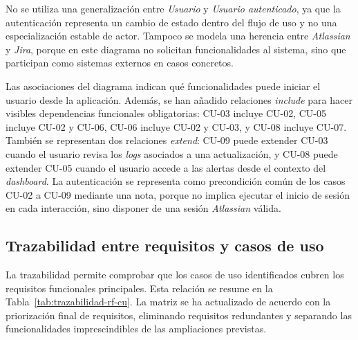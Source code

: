 No se utiliza una generalización entre \textit{Usuario} y \textit{Usuario autenticado}, ya que la autenticación representa un cambio de estado dentro del flujo de uso y no una especialización estable de actor. Tampoco se modela una herencia entre \textit{Atlassian} y \textit{Jira}, porque en este diagrama no solicitan funcionalidades al sistema, sino que participan como sistemas externos en casos concretos.

Las asociaciones del diagrama indican qué funcionalidades puede iniciar el usuario desde la aplicación. Además, se han añadido relaciones \textit{include} para hacer visibles dependencias funcionales obligatorias: CU-03 incluye CU-02, CU-05 incluye CU-02 y CU-06, CU-06 incluye CU-02 y CU-03, y CU-08 incluye CU-07. También se representan dos relaciones \textit{extend}: CU-09 puede extender CU-03 cuando el usuario revisa los \textit{logs} asociados a una actualización, y CU-08 puede extender CU-05 cuando el usuario accede a las alertas desde el contexto del \textit{dashboard}. La autenticación se representa como precondición común de los casos CU-02 a CU-09 mediante una nota, porque no implica ejecutar el inicio de sesión en cada interacción, sino disponer de una sesión \textit{Atlassian} válida.

\FloatBarrier
\subsection{Trazabilidad entre requisitos y casos de uso}

La trazabilidad permite comprobar que los casos de uso identificados cubren los requisitos funcionales principales. Esta relación se resume en la Tabla~\ref{tab:trazabilidad-rf-cu}. La matriz se ha actualizado de acuerdo con la priorización final de requisitos, eliminando requisitos redundantes y separando las funcionalidades imprescindibles de las ampliaciones previstas.

